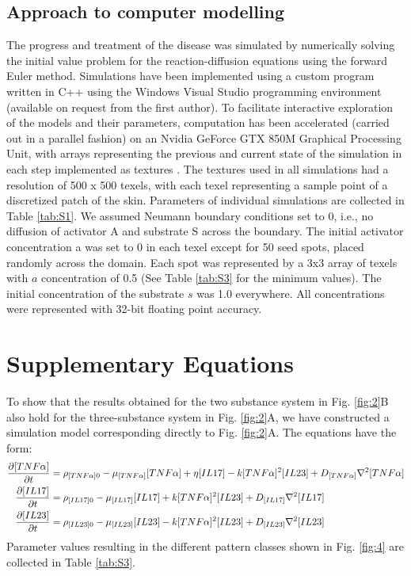 \subsection{Approach to computer modelling}
The progress and treatment of the disease was simulated by numerically solving the initial value problem for the reaction-diffusion equations using the forward Euler method. Simulations have been implemented using a custom program written in C++ using the Windows Visual Studio programming environment (available on request from the first author). To facilitate interactive exploration of the models and their parameters, computation has been accelerated (carried out in a parallel fashion) on an Nvidia GeForce GTX 850M Graphical Processing Unit, with arrays representing the previous and current state of the simulation in each step implemented as textures \citep{dematte2010, harris2005}. The textures used in all simulations had a resolution of 500 x 500 texels, with each texel representing a sample point of a discretized patch of the skin. Parameters of individual simulations are collected in Table \ref{tab:S1}. We assumed Neumann boundary conditions set to 0, i.e., no diffusion of activator A and substrate S across the boundary. The initial activator concentration a was set to 0 in each texel except for 50 seed spots, placed randomly across the domain.  Each spot was represented by a 3x3 array of texels with $a$ concentration of 0.5 (See Table \ref{tab:S3} for the minimum values). The initial concentration of the substrate $s$ was 1.0 everywhere.  All concentrations were represented with 32-bit floating point accuracy. 

\section{Supplementary Equations}
To show that the results obtained for the two substance system in Fig. \ref{fig:2}B also hold for the three-substance system in Fig. \ref{fig:2}A, we have constructed a simulation model corresponding directly to Fig. \ref{fig:2}A. The equations have the form: 
\begin{equation}
	\begin{aligned}
		\frac{\partial[TNF\alpha]}{\partial t}&=\rho_{[TNF\alpha]0}-\mu_{[TNF\alpha]}[TNF\alpha]+\eta[IL17]-k[TNF\alpha]^2[IL23]+D_{[TNF\alpha]}\nabla^2[TNF\alpha]\\
		\frac{\partial[IL17]}{\partial t}     &=\rho_{[IL17]0}     -\mu_{[IL17]}[IL17]                     +k[TNF\alpha]^2[IL23]+D_{[IL17]}\nabla^2[IL17]\\
		\frac{\partial[IL23]}{\partial t}     &=\rho_{[IL23]0}     -\mu_{[IL23]}[IL23]                     -k[TNF\alpha]^2[IL23]+D_{[IL23]}\nabla^2[IL23]
	\end{aligned}
\end{equation}
Parameter values resulting in the different pattern classes shown in Fig. \ref{fig:4} are collected in Table \ref{tab:S3}.

